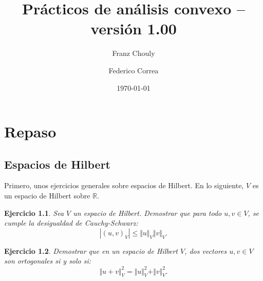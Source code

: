 \documentclass[11pt]{report}
\title{Prácticos de análisis convexo -- versi\'on 1.00}
\author{Franz Chouly \and Federico Correa}
\date{\today}
\newtheorem{ex}{Ejercicio}
\newenvironment{solution}{\begin{proof}[Solución]}{\end{proof}}
\newcommand{\inner}[2]{( #1, #2 )_V}
\newcommand{\norma}[1]{\Vert #1 \Vert_V}
\begin{document}
\maketitle
\tableofcontents


\chapter{Repaso}

\section{Espacios de Hilbert}

\noindent
Primero, unos ejercicios generales sobre espacios de Hilbert. En lo siguiente, $V$ es un espacio de Hilbert sobre $\mathbb{R}$.

\begin{ex}
Sea $V$ un espacio de Hilbert. Demostrar que para todo $u, v \in V$, se cumple la desigualdad de Cauchy-Schwarz:
\begin{equation*}
|\inner{u}{v}| \leq \norma{u} \norma{v}.
\end{equation*}
\end{ex}


\begin{ex}
Demostrar que en un espacio de Hilbert $V$, dos vectores $u, v \in V$ son ortogonales si y solo si:
\begin{equation*}
\norma{u + v}^2 = \norma{u}^2 + \norma{v}^2.
\end{equation*}
\end{ex}
\end{document}
